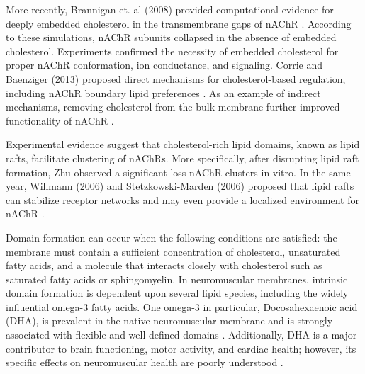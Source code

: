 \documentclass[final,3p,times,twocolumn]{elsarticle}
\begin{document}
More recently, Brannigan et. al (2008) provided computational evidence for deeply embedded cholesterol in the transmembrane gaps of nAChR \cite{brannigan}. According to these simulations, nAChR subunits collapsed in the absence of embedded cholesterol. Experiments confirmed the necessity of embedded cholesterol for proper nAChR conformation, ion conductance, and signaling\cite{Dalziel1980,Hamouda2006, medline7821683}. Corrie and Baenziger (2013) proposed direct mechanisms for cholesterol-based regulation, including nAChR boundary lipid preferences \cite{structure_2013}. As an example of indirect mechanisms, removing cholesterol from the bulk membrane further improved functionality of nAChR \cite{Leibel1987,Zabrecky1985,Kilian1980}. 



Experimental evidence suggest that cholesterol-rich lipid domains, known as lipid rafts, facilitate clustering of nAChRs\cite{Campagna2006, Marchand2002a, Pato2008}. 
More specifically, after disrupting lipid raft formation, Zhu observed a significant loss nAChR clusters in-vitro\cite{Zhu2006a}. In the same year, Willmann (2006) and Stetzkowski-Marden (2006) proposed that lipid rafts can stabilize receptor networks and may even provide a localized environment for nAChR \cite{Willmann2006,Stetzkowski-Marden2006}.

Domain formation can occur when the following conditions are satisfied: the membrane must contain a sufficient concentration of cholesterol, unsaturated fatty acids, and a molecule that interacts closely with cholesterol such as saturated fatty acids or sphingomyelin\cite{Feller_Acyl_2008,Yeagle2016115}. In neuromuscular membranes, intrinsic domain formation is dependent upon several lipid species, including the widely influential omega-3 fatty acids. One omega-3 in particular, Docosahexaenoic acid (DHA), is prevalent in the native neuromuscular membrane and is strongly associated with flexible and well-defined domains \cite{Turk2013,shaikh_dumaual_castillo_locascio_siddiqui_stillwell_wassall_2004}. Additionally, DHA is a major contributor to brain functioning, motor activity, and cardiac health; however, its specific effects on neuromuscular health are poorly understood \cite{12439486320170901, S000930840800032720080101, Georgieva2015}. 
\end{document}
